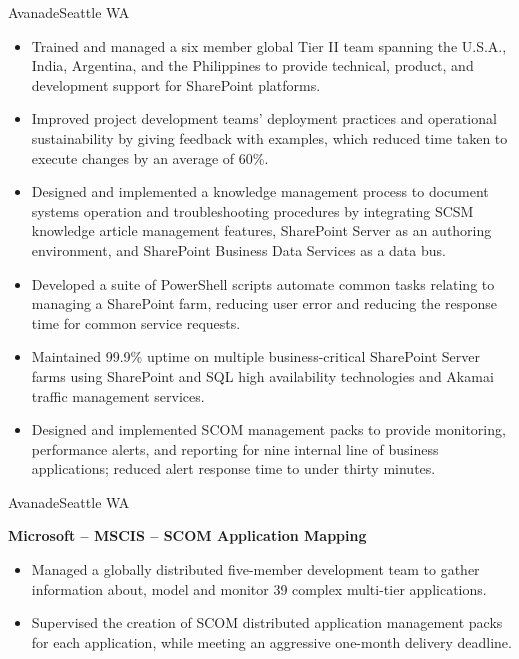 \documentclass[11pt,letter,roman]{moderncv} %
\begin{document}
{Avanade}{Seattle WA}{}{%
  \begin{itemize}
    \item Trained and managed a six member global Tier II team spanning the
      U.S.A., India, Argentina, and the Philippines to provide technical,
      product, and development support for SharePoint platforms.
    \item Improved project development teams’ deployment practices and
      operational sustainability by giving feedback with examples, which
      reduced time taken to execute changes by an average of 60\%.
    \item Designed and implemented a knowledge management process to document
      systems operation and troubleshooting procedures by integrating SCSM
      knowledge article management features, SharePoint Server as an authoring
      environment, and SharePoint Business Data Services as a data bus.
    \item Developed a suite of PowerShell scripts automate common tasks
      relating to managing a SharePoint farm, reducing user error and reducing
      the response time for common service requests.
    \item Maintained 99.9\% uptime on multiple business-critical SharePoint
      Server farms using SharePoint and SQL high availability technologies and
      Akamai traffic management services.
    \item Designed and implemented SCOM management packs to provide
      monitoring, performance alerts, and reporting for nine internal line of
      business applications; reduced alert response time to
      under thirty minutes.
  \end{itemize}
}
{Avanade}{Seattle WA}{}{%
  \textbf{Microsoft -- MSCIS -- SCOM Application Mapping}
  \begin{itemize}
    \item Managed a globally distributed five-member development team to
      gather information about, model and monitor 39 complex multi-tier
      applications.
    \item Supervised the creation of SCOM distributed application management
      packs for each application, while meeting an aggressive
      one-month delivery deadline.
  \end{itemize}
}
\end{document}
